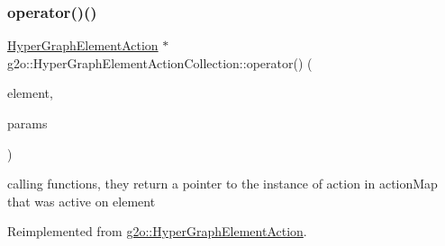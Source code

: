 \mbox{\label{classg2o_1_1_hyper_graph_element_action_collection_a1388f0d6629501c1b80035f80c56efbe}} 
\subsubsection{\texorpdfstring{operator()()}{operator()()}\hspace{0.1cm}{\footnotesize\ttfamily [1/2]}}
{\footnotesize\ttfamily \mbox{\hyperlink{classg2o_1_1_hyper_graph_element_action}{Hyper\+Graph\+Element\+Action}} $\ast$ g2o\+::\+Hyper\+Graph\+Element\+Action\+Collection\+::operator() (\begin{DoxyParamCaption}\item[{\mbox{\hyperlink{structg2o_1_1_hyper_graph_1_1_hyper_graph_element}{Hyper\+Graph\+::\+Hyper\+Graph\+Element}} $\ast$}]{element,  }\item[{\mbox{\hyperlink{structg2o_1_1_hyper_graph_element_action_1_1_parameters}{Hyper\+Graph\+Element\+Action\+::\+Parameters}} $\ast$}]{params }\end{DoxyParamCaption})\hspace{0.3cm}{\ttfamily [virtual]}}

calling functions, they return a pointer to the instance of action in action\+Map that was active on element 

Reimplemented from \mbox{\hyperlink{classg2o_1_1_hyper_graph_element_action_a2faab4a1cdaf5fc010cb9c8627b7d361}{g2o\+::\+Hyper\+Graph\+Element\+Action}}.

\mbox{\label{classg2o_1_1_hyper_graph_element_action_collection_a4cb9b20a8b1aac8eb018ef6fc4ec0dfc}} 
